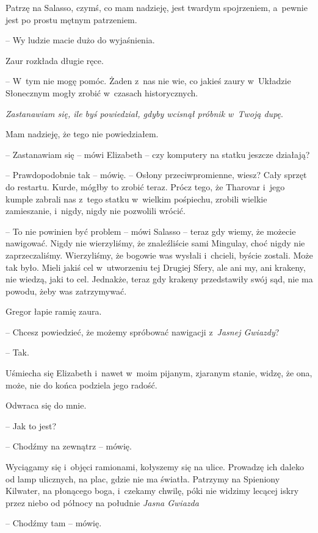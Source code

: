 \documentclass[oneside,polish,12pt,sfheadings]{mwbk}
\begin{document}
Patrzę na Salasso, czymś, co mam nadzieję, jest twardym spojrzeniem, a~pewnie jest po prostu mętnym patrzeniem.

-- Wy ludzie macie dużo do wyjaśnienia.

Zaur rozkłada długie ręce. 

-- W~tym nie mogę pomóc. Żaden z~nas nie wie,
co jakieś zaury w~Układzie Słonecznym mogły zrobić w~czasach
historycznych.

\emph{Zastanawiam się, ile byś powiedział, gdyby wcisnął próbnik w~Twoją
dupę}. 

Mam nadzieję, że tego nie powiedziałem.

-- Zastanawiam się -- mówi Elizabeth -- czy komputery na statku jeszcze
działają?

-- Prawdopodobnie tak -- mówię. -- Osłony przeciwpromienne, wiesz? Cały
sprzęt do restartu. Kurde, mógłby to zrobić teraz. Prócz tego, że
Tharovar i~jego kumple zabrali nas z~tego statku w~wielkim pośpiechu,
zrobili wielkie zamieszanie, i~nigdy, nigdy nie pozwolili wrócić.

-- To nie powinien być problem -- mówi Salasso -- teraz gdy wiemy, że
możecie nawigować. Nigdy nie wierzyliśmy, że znaleźliście sami Mingulay,
choć nigdy nie zaprzeczaliśmy. Wierzyliśmy, że bogowie was wysłali i~chcieli, byście zostali. Może tak było. Mieli jakiś cel w~utworzeniu tej
Drugiej Sfery, ale ani my, ani krakeny, nie wiedzą, jaki to cel.
Jednakże, teraz gdy krakeny przedstawiły swój sąd, nie ma powodu, żeby
was zatrzymywać.

Gregor łapie ramię zaura.

-- Chcesz powiedzieć, że możemy spróbować nawigacji z~\emph{Jasnej
Gwiazdy}?

-- Tak.

Uśmiecha się Elizabeth i~nawet w~moim pijanym, zjaranym stanie, widzę,
że ona, może, nie do końca podziela jego radość.

Odwraca się do mnie.

-- Jak to jest?

-- Chodźmy na zewnątrz -- mówię.

Wyciągamy się i~objęci ramionami, kołyszemy się na ulice. Prowadzę ich
daleko od lamp ulicznych, na plac, gdzie nie ma światła. Patrzymy na
Spieniony Kilwater, na płonącego boga, i~czekamy chwilę, póki nie
widzimy lecącej iskry przez niebo od północy na południe \emph{Jasna
Gwiazda } 

-- Chodźmy tam -- mówię. \\
\end{document}
